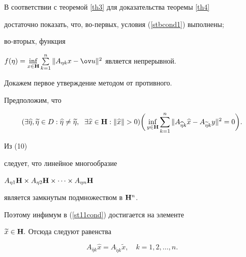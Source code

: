 \addtocounter{equation}{1}





\begin{pf}


В соответствии с теоремой \ref{th3} для доказательства теоремы \ref{th4}


достаточно показать, что, во-первых, условия (\ref{stbcond1}) выполнены;


во-вторых, функция


$f(\eta )=\inf\limits_{x\in {\bold H}}\sum\limits_{k=1}^n\| A_{\eta k}x-\ov


u\|^2$ является непрерывной. 


Докажем первое утверждение методом от противного.


Предположим, что


\begin{equation}


\label{st11cond}


( \exists \widehat \eta,\widetilde \eta \in D:\widehat \eta \neq


\widetilde \eta,\ \; \exists \widehat x\in {\bold H}:\| \widehat x\|


>0)\bigg ( \inf_{y\in {\bold H }}\sum_{k=1}^n\| A_{\widehat \eta


k}\widehat x-A_{\widetilde \eta k}y\|^2 =0\bigg).


\end{equation}


Из (10)




следует, что линейное многообразие


$A_{\eta 1}{\bold H}\times A_{\eta 2}{\bold H}\times \dotsb


\times A_{\eta n}{\bold H}$


является замкнутым подмножеством в ${\bold H}^n$.


Поэтому инфимум в (\ref{st11cond}) достигается на элементе


$\widetilde {x}\in {\bold H.}$ Отсюда следуют равенства 


\begin{equation}


\label{st3}


A_{\widehat \eta k}\widehat x=A_{\widetilde \eta k}\widetilde {x},\quad


k=1,2,\dotsc, n.


\end{equation}



\end{pf}

